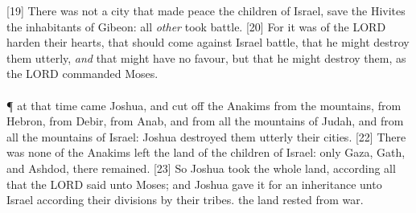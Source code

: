 [19] \textcolor[cmyk]{0.99998,1,0,0}{There was not a city that made peace  the children of Israel, save the Hivites the inhabitants of Gibeon: all \emph{other}  took  battle.}
[20] \textcolor[cmyk]{0.99998,1,0,0}{For it was of the LORD  harden their hearts, that  should come against Israel  battle, that he might destroy them utterly, \emph{and} that  might have no favour, but that he might destroy them, as the LORD commanded Moses.}\\
\\
\P \textcolor[cmyk]{0.99998,1,0,0}{ at that time came Joshua, and cut off the Anakims from the mountains, from Hebron, from Debir, from Anab, and from all the mountains of Judah, and from all the mountains of Israel: Joshua destroyed them utterly  their cities.}
[22] \textcolor[cmyk]{0.99998,1,0,0}{There was none of the Anakims left  the land of the children of Israel: only  Gaza,  Gath, and  Ashdod, there remained.}
[23] \textcolor[cmyk]{0.99998,1,0,0}{So Joshua took the whole land, according  all that the LORD said unto Moses; and Joshua gave it for an inheritance unto Israel according  their divisions by their tribes.  the land rested from war.}